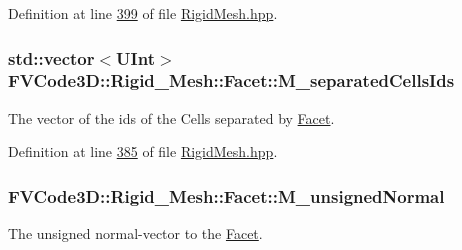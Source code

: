 Definition at line \hyperlink{RigidMesh_8hpp_source_l00399}{399} of file \hyperlink{RigidMesh_8hpp_source}{Rigid\+Mesh.\+hpp}.

\subsubsection[{\texorpdfstring{M\+\_\+separated\+Cells\+Ids}{M_separatedCellsIds}}]{\setlength{\rightskip}{0pt plus 5cm}std\+::vector$<${\bf U\+Int}$>$ F\+V\+Code3\+D\+::\+Rigid\+\_\+\+Mesh\+::\+Facet\+::\+M\+\_\+separated\+Cells\+Ids\hspace{0.3cm}{\ttfamily [protected]}}\hypertarget{classFVCode3D_1_1Rigid__Mesh_1_1Facet_ab6e36f3b09142a9cf4955c4be825cf11}{}\label{classFVCode3D_1_1Rigid__Mesh_1_1Facet_ab6e36f3b09142a9cf4955c4be825cf11}


The vector of the ids of the Cells separated by \hyperlink{classFVCode3D_1_1Rigid__Mesh_1_1Facet}{Facet}. 



Definition at line \hyperlink{RigidMesh_8hpp_source_l00385}{385} of file \hyperlink{RigidMesh_8hpp_source}{Rigid\+Mesh.\+hpp}.

\subsubsection[{\texorpdfstring{M\+\_\+unsigned\+Normal}{M_unsignedNormal}}]{ F\+V\+Code3\+D\+::\+Rigid\+\_\+\+Mesh\+::\+Facet\+::\+M\+\_\+unsigned\+Normal\hspace{0.3cm}{\ttfamily [protected]}}\hypertarget{classFVCode3D_1_1Rigid__Mesh_1_1Facet_a2a6a16d188a038509d285dd778c82f81}{}\label{classFVCode3D_1_1Rigid__Mesh_1_1Facet_a2a6a16d188a038509d285dd778c82f81}


The unsigned normal-\/vector to the \hyperlink{classFVCode3D_1_1Rigid__Mesh_1_1Facet}{Facet}. 



